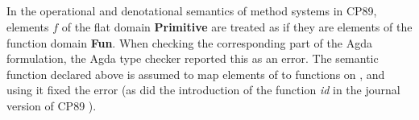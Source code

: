 \begin{AgdaAlign}
\begin{code}
\AgdaSpace{}%
\AgdaSpace{}%
\AgdaSymbol{)}%
\>[62]\AgdaSymbol{\}\}}\<%
\\
%
\>[4]\AgdaSymbol{(}\AgdaSpace{}%
%
\>[16]\AgdaSymbol{:}\AgdaSpace{}%
\AgdaSpace{}%
\AgdaSpace{}%
\AgdaSpace{}%
\AgdaSpace{}%
\AgdaSpace{}%
\AgdaSpace{}%
\AgdaSpace{}%
\AgdaSpace{}%
\AgdaSpace{}%
\AgdaSymbol{)}\<%
\\
\>[0][@{}l@{\AgdaIndent{4}}]%
\>[2]\<%
\\
\>[0]\AgdaSpace{}%
\AgdaSpace{}%
\AgdaSymbol{:}\AgdaSpace{}%
\AgdaSymbol{;}\AgdaSpace{}%
\AgdaSpace{}%
\AgdaSymbol{:}\AgdaSpace{}%
\AgdaSymbol{;}\AgdaSpace{}%
\AgdaSpace{}%
\AgdaSymbol{:}\AgdaSpace{}%
\AgdaSymbol{;}\AgdaSpace{}%
\AgdaSpace{}%
\AgdaSymbol{:}\AgdaSpace{}%
\AgdaSpace{}%
\AgdaSpace{}%
\<%
\\
\>[0]\AgdaSpace{}%
\AgdaSpace{}%
\AgdaSymbol{:}\AgdaSpace{}%
\AgdaSpace{}%
\AgdaSpace{}%
\AgdaSymbol{;}\AgdaSpace{}%
\AgdaSpace{}%
\AgdaSpace{}%
\AgdaSymbol{:}\AgdaSpace{}%
\AgdaSpace{}%
\AgdaSpace{}%
\AgdaSymbol{;}\AgdaSpace{}%
\AgdaSpace{}%
\AgdaSymbol{:}\AgdaSpace{}%
\AgdaSpace{}%
\AgdaSpace{}%
\<%
\end{code}
%
In the operational and denotational semantics of method systems in CP89,
elements $f$ of the flat domain \textbf{Primitive} are treated
as if they are elements of the function domain \textbf{Fun}.
When checking the corresponding part of the Agda formulation,
the Agda type checker reported this as an error.
The semantic function  declared above is assumed to map
elements of  to functions on ,
and using it fixed the error
(as did the introduction of the function \textit{id} in the journal version of CP89 \cite{Cook1994DSI}).


\end{AgdaAlign}
